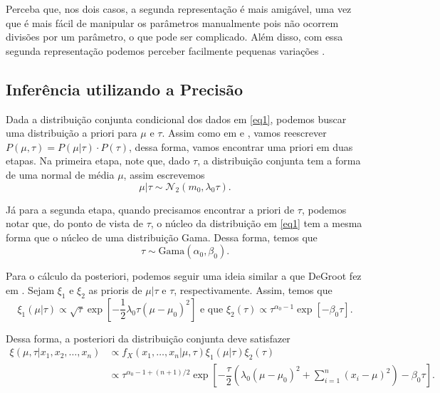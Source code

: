 \documentclass{article}
\begin{document}
Perceba que, nos dois casos, a segunda representação é mais amigável, uma vez que é mais fácil de manipular os parâmetros manualmente pois não ocorrem divisões por um parâmetro, o que pode ser complicado. Além disso, com essa segunda representação podemos perceber facilmente pequenas variações \cite{stackexchange}.

\subsection*{Inferência utilizando a Precisão}

Dada a distribuição conjunta condicional dos dados em \ref{eq1}, podemos buscar uma distribuição a priori para $\mu$ e $\tau$. Assim como em \cite{ehlers} e \cite{ehlers2}, vamos reescrever $P(\mu, \tau) = P(\mu | \tau)\cdot P(\tau)$, dessa forma, vamos encontrar uma priori em duas etapas. Na primeira etapa, note que, dado $\tau$, a distribuição conjunta tem a forma de uma normal de média $\mu$, assim escrevemos
\[\mu | \tau \sim \mathcal{N}_2(m_0, \lambda_0 \tau).\]

Já para a segunda etapa, quando precisamos encontrar a priori de $\tau$, podemos notar que, do ponto de vista de $\tau$, o núcleo da distribuição em \ref{eq1} tem a mesma forma que o núcleo de uma distribuição Gama. Dessa forma, temos que
\[\tau \sim \text{Gama}\left(\alpha_0, \beta_0\right).\]

Para o cálculo da posteriori, podemos seguir uma ideia similar a que DeGroot fez em \cite{degroot}. Sejam $\xi_1$ e $\xi_2$ as prioris de $\mu | \tau$ e $\tau$, respectivamente. Assim, temos que
\[\xi_1(\mu | \tau) \propto \sqrt{\tau} \exp{\left[-\dfrac{1}{2}\lambda_0 \tau (\mu - \mu_0)^2\right]} \text{ e que } \xi_2(\tau) \propto \tau^{\alpha_0 - 1} \exp{\left[- \beta_0 \tau\right]}.\]

Dessa forma, a posteriori da distribuição conjunta deve satisfazer
\begin{equation}
    \label{post1}
    \begin{split}
        \xi(\mu, \tau | x_1, x_2, \dots, x_n) & \propto f_X(x_1, \dots, x_n | \mu, \tau) \xi_1(\mu | \tau) \xi_2(\tau) \\
        & \propto \tau^{\alpha_0 - 1 + (n + 1)/2} \exp{\left[-\dfrac{\tau}{2}\left(\lambda_0 (\mu - \mu_0)^2 + \sum_{i = 1}^{n}\left(x_i - \mu\right)^2\right) - \beta_0 \tau\right]}.
    \end{split}
\end{equation}
\end{document}
